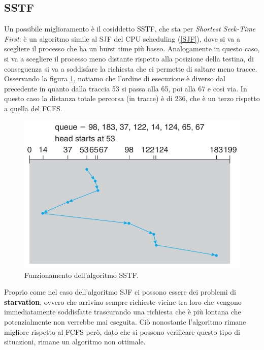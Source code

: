 \subsection{SSTF}
Un possibile miglioramento è il cosiddetto SSTF, che sta per \textit{Shortest Seek-Time First}: è un algoritmo simile al SJF del CPU scheduling (\ref{SJF}), dove si va a scegliere il processo che ha un burst time più basso. Analogamente in questo caso, si va a scegliere il processo meno distante rispetto alla posizione della testina, di conseguenza si va a soddisfare la richiesta che ci permette di saltare meno tracce. Osservando la figura \ref{fig:SSTF}, notiamo che l'ordine di esecuzione è diverso dal precedente in quanto dalla traccia 53 si passa alla 65, poi alla 67 e così via. In questo caso la distanza totale percorsa (in tracce) è di 236, che è un terzo rispetto a quella del FCFS.
\begin{figure}[h]
    \centering
    \includegraphics[width = .5\textwidth]{../res/imgs/mass memory/SSTF.png}
    \caption{Funzionamento dell'algoritmo SSTF.}
    \label{fig:SSTF}
\end{figure}
Proprio come nel caso dell'algoritmo SJF ci possono essere dei problemi di \textbf{starvation}, ovvero che arrivino sempre richieste vicine tra loro che vengono immediatamente soddisfatte trascurando una richiesta che è più lontana che potenzialmente non verrebbe mai eseguita. Ciò nonostante l'algoritmo rimane migliore rispetto al FCFS però, dato che si possono verificare questo tipo di situazioni, rimane un algoritmo non ottimale.

%
